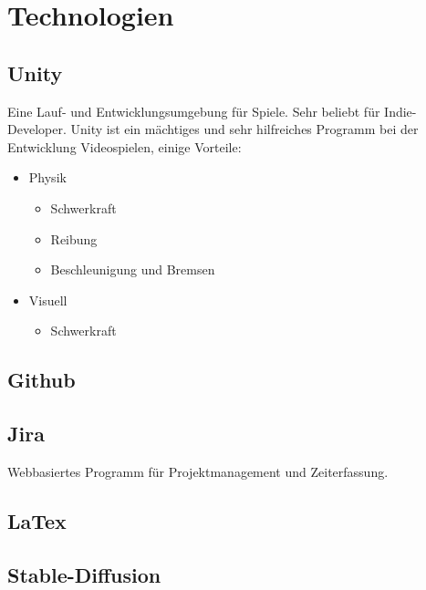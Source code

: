 \chapter{Technologien}

\section{Unity}
Eine Lauf- und Entwicklungsumgebung für Spiele.
Sehr beliebt für Indie-Developer.
Unity ist ein mächtiges und sehr hilfreiches Programm bei der Entwicklung Videospielen, einige Vorteile:
\begin{itemize}
    \item Physik
    \begin{itemize}
        \item Schwerkraft
        \item Reibung
        \item Beschleunigung und Bremsen
    \end{itemize}
    \item Visuell
    \begin{itemize}
        \item Schwerkraft
    \end{itemize}
\end{itemize}

\section{Github}

\section{Jira}
Webbasiertes Programm für Projektmanagement und Zeiterfassung.

\section{LaTex}

\section{Stable-Diffusion}

